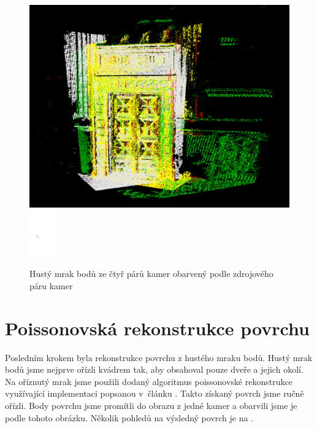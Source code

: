 \documentclass[11pt,oneside,a4paper,pdftex]{article}   %
\begin{document}
			\begin{figure}[htbp]
					\centering
						\includegraphics[width=12.8cm]{pictures/points_from_stereo_coloured_by_pair-pairs-01_02-01_05-02_06-03_07.png}
						\hskip 10pt
						\includegraphics[height=2cm]{pictures/points_from_stereo_coloured-legend.pdf}
				\caption{Hustý mrak bodů ze čtyř párů kamer obarvený podle zdrojového páru kamer}
				\label{figPointsFromStereoColouredBySourcePair}
			\end{figure}
	
	
\section{Poissonovská rekonstrukce povrchu}

	Posledním krokem byla rekonstrukce povrchu z hustého mraku bodů. Hustý mrak bodů jsme nejprve ořízli
	kvádrem tak, aby obsahoval pouze dveře a jejich okolí. Na oříznutý mrak jsme použili dodaný
	algoritmus poissonovské rekonstrukce využívající implementaci popsanou v~článku \cite{Kazhdan:2006:PSR}.
	Takto získaný povrch jsme ručně ořízli. Body povrchu jsme promítli do obrazu z jedné kamer
	a obarvili jsme je podle tohoto obrázku.  Několik pohledů na výsledný povrch je na .
\end{document}
